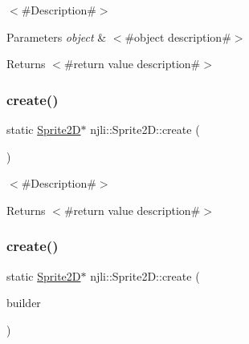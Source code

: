 $<$\#\+Description\#$>$


\begin{DoxyParams}{Parameters}
{\em object} & $<$\#object description\#$>$\\
\hline
\end{DoxyParams}
\begin{DoxyReturn}{Returns}
$<$\#return value description\#$>$ 
\end{DoxyReturn}
\mbox{\label{classnjli_1_1_sprite2_d_a93ea0b2082fb0be44e226f0a75cb1280}} 
\subsubsection{\texorpdfstring{create()}{create()}\hspace{0.1cm}{\footnotesize\ttfamily [1/2]}}
{\footnotesize\ttfamily static \mbox{\hyperlink{classnjli_1_1_sprite2_d}{Sprite2D}}$\ast$ njli\+::\+Sprite2\+D\+::create (\begin{DoxyParamCaption}{ }\end{DoxyParamCaption})\hspace{0.3cm}{\ttfamily [static]}}

$<$\#\+Description\#$>$

\begin{DoxyReturn}{Returns}
$<$\#return value description\#$>$ 
\end{DoxyReturn}
\mbox{\label{classnjli_1_1_sprite2_d_a36d602af7f4cc35c181e5cd89aeaf1e5}} 
\subsubsection{\texorpdfstring{create()}{create()}\hspace{0.1cm}{\footnotesize\ttfamily [2/2]}}
{\footnotesize\ttfamily static \mbox{\hyperlink{classnjli_1_1_sprite2_d}{Sprite2D}}$\ast$ njli\+::\+Sprite2\+D\+::create (\begin{DoxyParamCaption}\item[{const \mbox{\hyperlink{classnjli_1_1_sprite2_d_builder}{Sprite2\+D\+Builder}} \&}]{builder }\end{DoxyParamCaption})\hspace{0.3cm}{\ttfamily [static]}}

